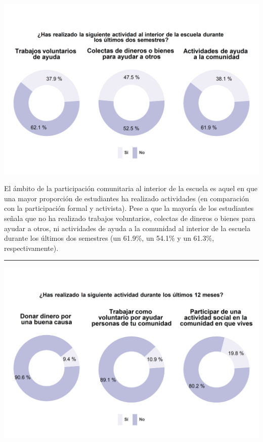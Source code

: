 \documentclass[
  14pt,
]{book}
\let\origfigure\figure
\let\endorigfigure\endfigure
\renewenvironment{figure}[1][2] {
  \expandafter\origfigure\expandafter[H]
} {
  \endorigfigure
}
\begin{document}
\begin{figure}[!ht]

{\centering \includegraphics[width=0.8\linewidth,]{images/graph_partcom_esc} 

}

\caption{Participación comunitaria al interior de la escuela}\label{fig:unnamed-chunk-57}
\end{figure}

El ámbito de la participación comunitaria al interior de la escuela es aquel en que una mayor proporción de estudiantes ha realizado actividades (en comparación con la participación formal y activista). Pese a que la mayoría de los estudiantes señala que no ha realizado trabajos voluntarios, colectas de dineros o bienes para ayudar a otros, ni actividades de ayuda a la comunidad al interior de la escuela durante los últimos dos semestres (un 61.9\%, un 54.1\% y un 61.3\%, respectivamente).

\begin{center}\rule{0.5\linewidth}{0.5pt}\end{center}

\begin{figure}[!ht]

{\centering \includegraphics[width=0.8\linewidth,]{images/graph_partcom} 

}

\caption{Participación comunitaria fuera de la escuela}\label{fig:unnamed-chunk-58}
\end{figure}
\end{document}
